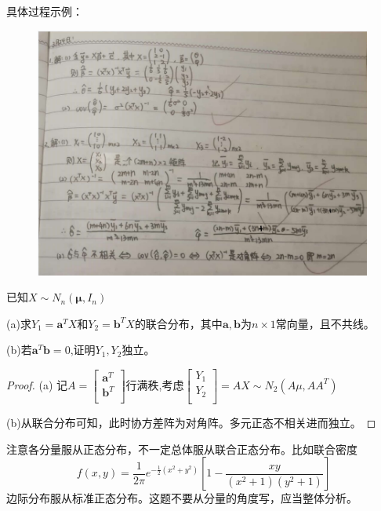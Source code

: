 \documentclass[cn,hazy,green,12pt,normal]{elegantnote}
\numberwithin{equation}{section}
\numberwithin{subsection}{section}
\begin{document}
\begin{note}
    具体过程示例： %
    
    \begin{figure}[!htbp]
        \centering
        \includegraphics[width=30em]{image/ex2_plt8.png}
    \end{figure} 
    
\end{note}
\begin{homework}
    已知$X\sim N_n(\bm \mu, I_n )$

    (a)求$Y_1=\bm a ^T X$和$Y_2=\bm b^T X$的联合分布，其中$\bm a, \bm b$为$n\times 1$常向量，且不共线。

    (b)若$\bm a^T \bm b=0$,证明$Y_1,Y_2$独立。
\end{homework}

\begin{proof}
    (a) 记$A=\begin{bmatrix}
        \bm a^T\\
        \bm b^T\\
    \end{bmatrix}$行满秩,考虑$\begin{bmatrix}
        Y_1 \\
        Y_2\\
    \end{bmatrix}=AX\sim N_2(A\mu,AA^T)$
    
    (b)从联合分布可知，此时协方差阵为对角阵。多元正态不相关进而独立。
\end{proof}

\begin{note}
    注意各分量服从正态分布，不一定总体服从联合正态分布。比如联合密度
    \[f(x,y)=\dfrac{1}{2\pi} e^{-\frac{1}{2}(x^2+y^2)}\left[ 1-\dfrac{xy}{(x^2+1)(y^2+1)}\right]\]
    边际分布服从标准正态分布。这题不要从分量的角度写，应当整体分析。
\end{note}
\end{document}
